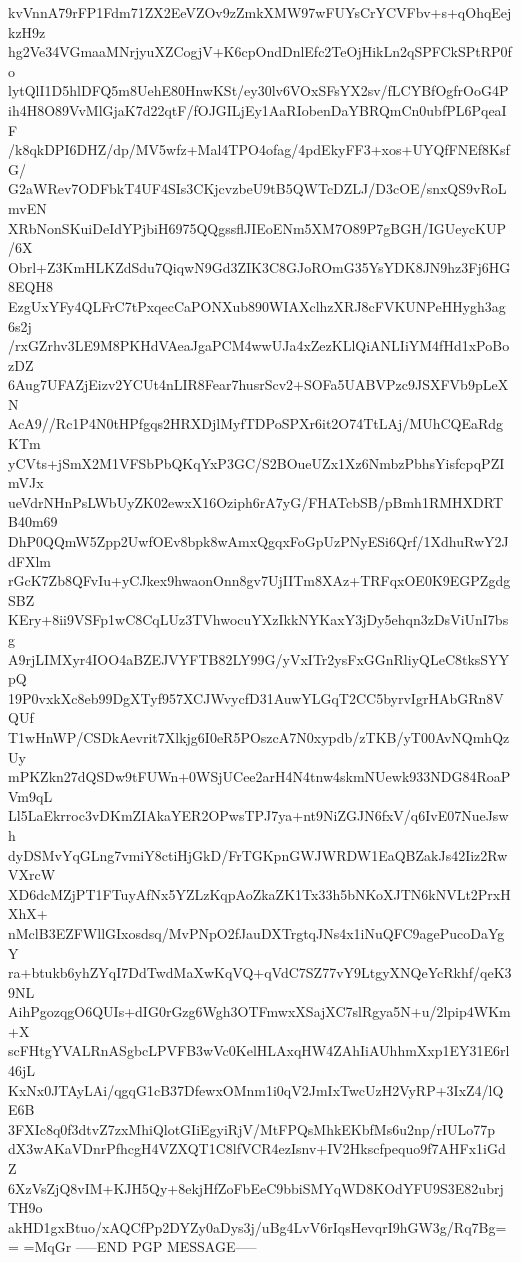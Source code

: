 kvVnnA79rFP1Fdm71ZX2EeVZOv9zZmkXMW97wFUYsCrYCVFbv+s+qOhqEejkzH9z
hg2Ve34VGmaaMNrjyuXZCogjV+K6cpOndDnlEfc2TeOjHikLn2qSPFCkSPtRP0fo
lytQlI1D5hlDFQ5m8UehE80HnwKSt/ey30lv6VOxSFsYX2sv/fLCYBfOgfrOoG4P
ih4H8O89VvMlGjaK7d22qtF/fOJGILjEy1AaRIobenDaYBRQmCn0ubfPL6PqeaIF
/k8qkDPI6DHZ/dp/MV5wfz+Mal4TPO4ofag/4pdEkyFF3+xos+UYQfFNEf8KsfG/
G2aWRev7ODFbkT4UF4SIs3CKjcvzbeU9tB5QWTcDZLJ/D3cOE/snxQS9vRoLmvEN
XRbNonSKuiDeIdYPjbiH6975QQgssflJIEoENm5XM7O89P7gBGH/IGUeycKUP/6X
Obrl+Z3KmHLKZdSdu7QiqwN9Gd3ZIK3C8GJoROmG35YsYDK8JN9hz3Fj6HG8EQH8
EzgUxYFy4QLFrC7tPxqecCaPONXub890WIAXclhzXRJ8cFVKUNPeHHygh3ag6s2j
/rxGZrhv3LE9M8PKHdVAeaJgaPCM4wwUJa4xZezKLlQiANLIiYM4fHd1xPoBozDZ
6Aug7UFAZjEizv2YCUt4nLIR8Fear7husrScv2+SOFa5UABVPzc9JSXFVb9pLeXN
AcA9//Rc1P4N0tHPfgqs2HRXDjlMyfTDPoSPXr6it2O74TtLAj/MUhCQEaRdgKTm
yCVts+jSmX2M1VFSbPbQKqYxP3GC/S2BOueUZx1Xz6NmbzPbhsYisfcpqPZImVJx
ueVdrNHnPsLWbUyZK02ewxX16Oziph6rA7yG/FHATcbSB/pBmh1RMHXDRTB40m69
DhP0QQmW5Zpp2UwfOEv8bpk8wAmxQgqxFoGpUzPNyESi6Qrf/1XdhuRwY2JdFXlm
rGcK7Zb8QFvIu+yCJkex9hwaonOnn8gv7UjIITm8XAz+TRFqxOE0K9EGPZgdgSBZ
KEry+8ii9VSFp1wC8CqLUz3TVhwocuYXzIkkNYKaxY3jDy5ehqn3zDsViUnI7bsg
A9rjLIMXyr4IOO4aBZEJVYFTB82LY99G/yVxITr2ysFxGGnRliyQLeC8tksSYYpQ
19P0vxkXc8eb99DgXTyf957XCJWvycfD31AuwYLGqT2CC5byrvIgrHAbGRn8VQUf
T1wHnWP/CSDkAevrit7Xlkjg6I0eR5POszcA7N0xypdb/zTKB/yT00AvNQmhQzUy
mPKZkn27dQSDw9tFUWn+0WSjUCee2arH4N4tnw4skmNUewk933NDG84RoaPVm9qL
Ll5LaEkrroc3vDKmZIAkaYER2OPwsTPJ7ya+nt9NiZGJN6fxV/q6IvE07NueJswh
dyDSMvYqGLng7vmiY8ctiHjGkD/FrTGKpnGWJWRDW1EaQBZakJs42Iiz2RwVXrcW
XD6dcMZjPT1FTuyAfNx5YZLzKqpAoZkaZK1Tx33h5bNKoXJTN6kNVLt2PrxHXhX+
nMclB3EZFWllGIxosdsq/MvPNpO2fJauDXTrgtqJNs4x1iNuQFC9agePucoDaYgY
ra+btukb6yhZYqI7DdTwdMaXwKqVQ+qVdC7SZ77vY9LtgyXNQeYcRkhf/qeK39NL
AihPgozqgO6QUIs+dIG0rGzg6Wgh3OTFmwxXSajXC7slRgya5N+u/2lpip4WKm+X
scFHtgYVALRnASgbcLPVFB3wVc0KelHLAxqHW4ZAhIiAUhhmXxp1EY31E6rl46jL
KxNx0JTAyLAi/qgqG1cB37DfewxOMnm1i0qV2JmIxTwcUzH2VyRP+3IxZ4/lQE6B
3FXIc8q0f3dtvZ7zxMhiQlotGIiEgyiRjV/MtFPQsMhkEKbfMs6u2np/rIULo77p
dX3wAKaVDnrPfhcgH4VZXQT1C8lfVCR4ezIsnv+IV2Hkscfpequo9f7AHFx1iGdZ
6XzVsZjQ8vIM+KJH5Qy+8ekjHfZoFbEeC9bbiSMYqWD8KOdYFU9S3E82ubrjTH9o
akHD1gxBtuo/xAQCfPp2DYZy0aDys3j/uBg4LvV6rIqsHevqrI9hGW3g/Rq7Bg==
=MqGr
-----END PGP MESSAGE-----
